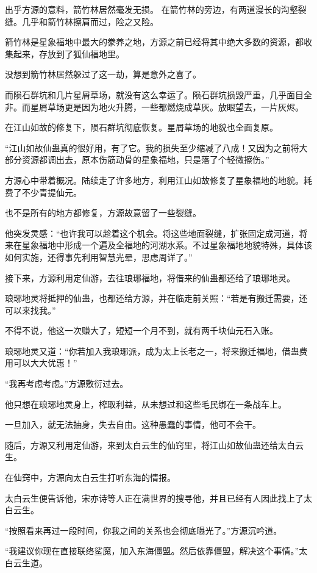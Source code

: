 \begin{this_body}
出乎方源的意料，箭竹林居然毫发无损。  在箭竹林的旁边，有两道漫长的沟壑裂缝。几乎和箭竹林擦肩而过，险之又险。

箭竹林是星象福地中最大的豢养之地，方源之前已经将其中绝大多数的资源，都收集起来，存放到了狐仙福地里。

没想到箭竹林居然躲过了这一劫，算是意外之喜了。

而陨石群坑和几片星屑草场，就没有这么幸运了。陨石群坑损毁严重，几乎面目全非。而星屑草场更是因为地火升腾，一些都燃烧成草灰。放眼望去，一片灰烬。

在江山如故的修复下，陨石群坑彻底恢复。星屑草场的地貌也全面复原。

“江山如故仙蛊真的很好用，有了它。我的损失至少缩减了八成！又因为之前将大部分资源都调出去，原本伤筋动骨的星象福地，只是落了个轻微擦伤。”

方源心中带着概况。陆续走了许多地方，利用江山如故修复了星象福地的地貌。耗费了不少青提仙元。

也不是所有的地方都修复，方源故意留了一些裂缝。

他突发灵感：“也许我可以趁着这个机会。将这些地面裂缝，扩张固定成河道，将来在星象福地中形成一个遍及全福地的河湖水系。不过星象福地地貌特殊，具体该如何实施，还得事先利用智慧光晕，思虑周详了。”

接下来，方源利用定仙游，去往琅琊福地，将借来的仙蛊都还给了琅琊地灵。

琅琊地灵将抵押的仙蛊，也都还给方源，并在临走前关照：“若是有搬迁需要，还可以来找我。”

不得不说，他这一次赚大了，短短一个月不到，就有两千块仙元石入账。

琅琊地灵又道：“你若加入我琅琊派，成为太上长老之一，将来搬迁福地，借蛊费用可以大大优惠！”

“我再考虑考虑。”方源敷衍过去。

他只想在琅琊地灵身上，榨取利益，从未想过和这些毛民绑在一条战车上。

一旦加入，就无法抽身，失去自由。这种愚蠢的事情，他可不会干。

随后，方源又利用定仙游，来到太白云生的仙窍里，将江山如故仙蛊还给太白云生。

在仙窍中，方源向太白云生打听东海的情报。

太白云生便告诉他，宋亦诗等人正在满世界的搜寻他，并且已经有人因此找上了太白云生。

“按照看来再过一段时间，你我之间的关系也会彻底曝光了。”方源沉吟道。

“我建议你现在直接联络鲨魔，加入东海僵盟。然后依靠僵盟，解决这个事情。”太白云生道。


\end{this_body}
